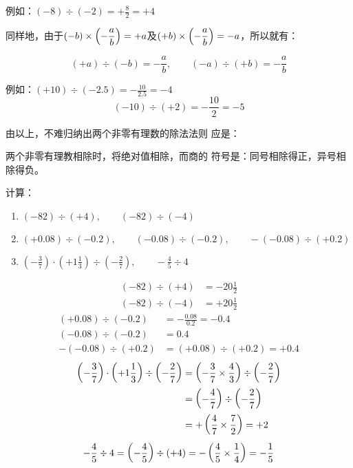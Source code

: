 例如：$(-8)\div (-2)=+\frac{8}{2}=+4$

同样地，由于$(-b)\times \left(-\dfrac{a}{b}\right)=+a$及$(+b)\times \left(-\dfrac{a}{b}\right)=-a$，所以就有：

\[(+a)\div (-b)=-\frac{a}{b},\qquad   (-a)\div (+b)=-\frac{a}{b}\]

例如：$(+10)\div (-2.5)=-\frac{10}{2.5}=-4$
\[(-10)\div (+2)=-\frac{10}{2}=-5 \]

由以上，不难归纳出两个非零有理数的除法法则
应是：

\begin{blk}{}
	两个非零有理教相除时，将绝对值相除，而商的
	符号是：同号相除得正，异号相除得负。
\end{blk}

\begin{example}
	计算：
	\begin{enumerate}
		\item $(-82)\div (+4),\qquad (-82)\div (-4)$
		\item $(+0.08)\div (-0.2),\qquad (-0.08)\div (-0.2),\qquad -(-0.08)\div (+0.2)$
		\item $\left(-\frac{3}{7}\right)\cdot \left(+1\frac{1}{3}\right)\div \left(-\frac{2}{7}\right),\qquad -\frac{4}{5}\div 4$
	\end{enumerate}
\end{example}

\begin{solution}
	\[\begin{split}
	(-82)\div (+4)&=-20\frac{1}{2}\\
	(-82)\div (-4)&=+20\frac{1}{2}
	\end{split}\]
	\[\begin{split}
	(+0.08)\div (-0.2)&=-\frac{0.08}{0.2}=-0.4\\
	(-0.08)\div (-0.2)&=0.4\\
	-(-0.08)\div (+0.2)&=(+0.08)\div (+0.2)=+0.4
	\end{split}\]
	\[\begin{split}
	\left(-\dfrac{3}{7}\right)\cdot \left(+1\dfrac{1}{3}\right)\div \left(-\dfrac{2}{7}\right)&= \left(-\dfrac{3}{7}\times\dfrac{4}{3}\right) \div \left(-\dfrac{2}{7}\right)\\
	&=\left(-\dfrac{4}{7}\right)\div \left(-\dfrac{2}{7}\right)\\
	&=+\left(\dfrac{4}{7}\times\dfrac{7}{2}\right)=+2
	\end{split}\]
	\[-\dfrac{4}{5}\div 4=\left(-\dfrac{4}{5}\right)\div (+4)=-\left(\dfrac{4}{5}\times\dfrac{1}{4}\right)=-\dfrac{1}{5} \]
\end{solution}

